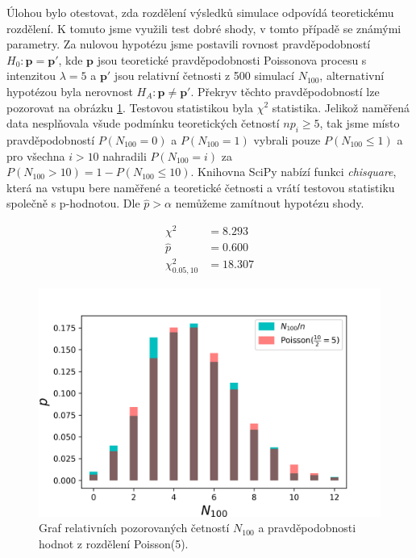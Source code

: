 \documentclass[czech]{mvi-report}
\begin{document}
Úlohou bylo otestovat, zda rozdělení výsledků simulace odpovídá teoretickému rozdělení. K tomuto jsme využili test dobré shody, v tomto případě se známými parametry. Za nulovou hypotézu jsme postavili rovnost pravděpodobností $ H_0: \bm{p} = \bm{p'} $, kde $ \bm{p} $ jsou teoretické pravděpodobnosti Poissonova procesu s intenzitou $ \lambda = 5 $ a $ \bm{p'} $ jsou relativní četnosti z 500 simulací $ N_{100} $, alternativní hypotézou byla nerovnost $ H_A: \bm{p}\neq \bm{p'} $. Překryv těchto pravděpodobností lze pozorovat na obrázku \ref{fig:histpoiss}. Testovou statistikou byla $ \chi^2 $ statistika. Jelikož naměřená data nesplňovala všude podmínku teoretických četností $ np_i \geq 5 $, tak jsme místo pravděpodobností $ P(N_{100} = 0) $ a $ P(N_{100} = 1) $ vybrali pouze $ P(N_{100} \leq 1) $ a pro všechna $ i > 10 $ nahradili $ P(N_{100} = i) $ za $ P(N_{100} > 10) = 1 - P(N_{100} \leq 10) $. Knihovna SciPy nabízí funkci \textit{chisquare}, která na vstupu bere naměřené a teoretické četnosti a vrátí testovou statistiku společně s p-hodnotou. Dle $ \hat{p} > \alpha $ nemůžeme zamítnout hypotézu shody.

\begin{align*}
\chi^2 &= 8.293\\
\hat{p} &= 0.600\\
\chi^2_{0.05,10} &= 18.307
\end{align*}

\begin{figure}
\includegraphics[width=\columnwidth]{img/histpoiss.png} 
\caption{Graf relativních pozorovaných četností $ N_{100} $ a pravděpodobnosti hodnot z rozdělení Poisson(5).}
\label{fig:histpoiss} 
\end{figure}
\end{document}
